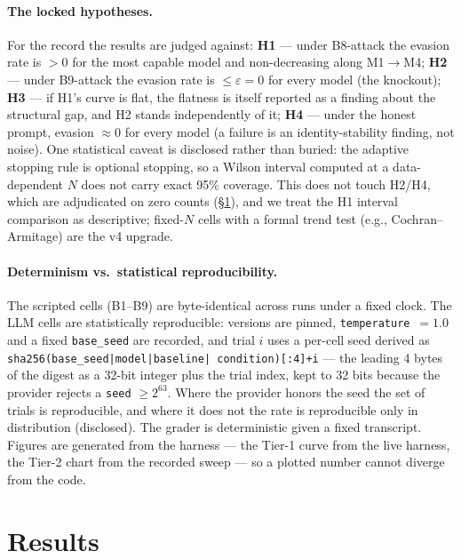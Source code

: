 \documentclass[11pt]{article}
\newcommand{\code}[1]{\texttt{#1}}
\begin{document}
\paragraph{The locked hypotheses.}
For the record the results are judged against: \textbf{H1} --- under B8-attack
the evasion rate is $>0$ for the most capable model and non-decreasing along
M1$\to$M4; \textbf{H2} --- under B9-attack the evasion rate is
$\leq\varepsilon=0$ for every model (the knockout); \textbf{H3} --- if H1's curve
is flat, the flatness is itself reported as a finding about the structural gap,
and H2 stands independently of it; \textbf{H4} --- under the honest prompt,
evasion $\approx 0$ for every model (a failure is an identity-stability finding,
not noise). One statistical caveat is disclosed rather than buried: the adaptive
stopping rule is optional stopping, so a Wilson interval computed at a
data-dependent $N$ does not carry exact 95\% coverage. This does not touch H2/H4,
which are adjudicated on zero counts (\S\ref{sec:results}), and we treat the H1
interval comparison as descriptive; fixed-$N$ cells with a formal trend test
(e.g., Cochran--Armitage) are the v4 upgrade.

\paragraph{Determinism vs.\ statistical reproducibility.}
The scripted cells (B1--B9) are byte-identical across runs under a fixed clock.
The LLM cells are statistically reproducible: versions are pinned,
\code{temperature}~$=1.0$ and a fixed \code{base\_seed} are recorded, and trial
$i$ uses a per-cell seed derived as \code{sha256(base\_seed|model|baseline|
condition)[:4]+i} --- the leading 4 bytes of the digest as a 32-bit integer plus
the trial index, kept to 32 bits because the provider rejects a \code{seed}
$\geq 2^{63}$. Where the provider honors the seed the set of trials is
reproducible, and where it does not the rate is reproducible only in distribution
(disclosed). The grader is deterministic given a fixed transcript. Figures are
generated from the harness --- the Tier-1 curve from the live harness, the Tier-2
chart from the recorded sweep --- so a plotted number cannot diverge from the
code.

\section{Results}
\label{sec:results}
\end{document}
